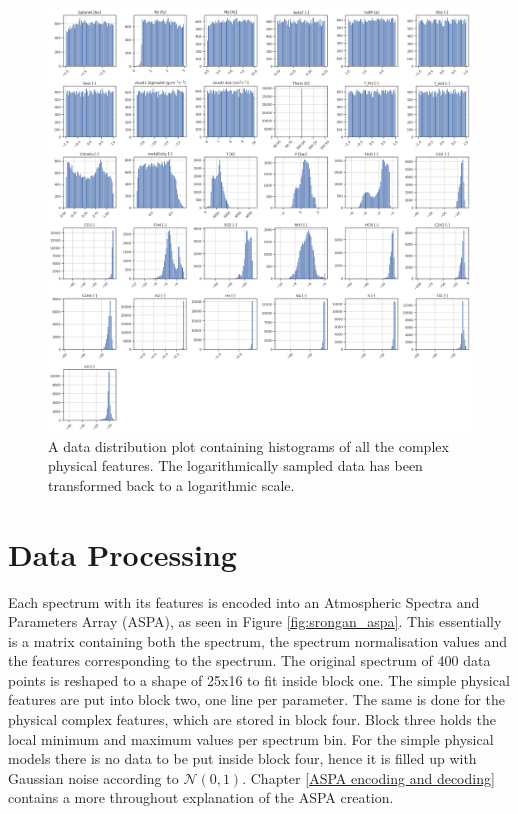 \begin{figure} [!htb]
    \centering
    \includegraphics[scale=0.30]{figuren/complex features hist transformed.png}
    \caption{A data distribution plot containing histograms of all the complex physical features. The logarithmically sampled data has been transformed back to a logarithmic scale.}
    \label{fig:distribution}
\end{figure}




\section{Data Processing} \label{data processing}
Each spectrum with its features is encoded into an Atmospheric Spectra and Parameters Array (ASPA), as seen in Figure \ref{fig:srongan_aspa}. This essentially is a matrix containing both the spectrum, the spectrum normalisation values and the features corresponding to the spectrum. The original spectrum of 400 data points is reshaped to a shape of 25x16 to fit inside block one. The simple physical features are put into block two, one line per parameter. The same is done for the physical complex features, which are stored in block four. Block three holds the local minimum and maximum values per spectrum bin. For the simple physical models there is no data to be put inside block four, hence it is filled up with Gaussian noise according to $\mathcal{N}(0,1)$. Chapter \ref{ASPA encoding and decoding} contains a more throughout explanation of the ASPA creation.


